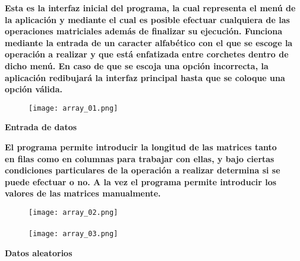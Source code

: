 \documentclass[letterpaper]{article}
\begin{document}
\begin{flushleft}
\textbf{\Large Esta es la interfaz inicial del programa, la cual representa el men\'u de la aplicaci\'on y mediante el cual es posible efectuar cualquiera de las operaciones matriciales adem\'as de finalizar su ejecuci\'on. Funciona mediante la entrada de un caracter alfab\'etico con el que se escoge la operaci\'on a realizar y que est\'a enfatizada entre corchetes dentro de dicho men\'u. En caso de que se escoja una opci\'on incorrecta, la aplicaci\'on redibujar\'a la interfaz principal hasta que se coloque una opci\'on v\'alida.\\}
\vspace{0.5cm}
\end{flushleft}
\begin{center}
\begin{figure}[H] %
\texttt{[image: array\_01.png]}
\end{figure}
\end{center}

\clearpage

\begin{center}
\textbf{\LARGE Entrada de datos\\}
\vspace{0.5cm}
\end{center}

\begin{flushleft}
\textbf{\Large El programa permite introducir la longitud de las matrices tanto\\
en filas como en columnas para trabajar con ellas, y bajo ciertas condiciones particulares de la operaci\'on a realizar determina si se puede efectuar o no. A la vez el programa permite introducir los valores de las matrices manualmente.\\}
\vspace{0.5cm}
\end{flushleft}
\begin{center}
\begin{figure}[H] %
\texttt{[image: array\_02.png]}
\\
\\
\texttt{[image: array\_03.png]}
\end{figure}
\end{center}

\begin{center}
\textbf{\LARGE Datos aleatorios\\}
\vspace{0.5cm}
\end{center}
\end{document}
